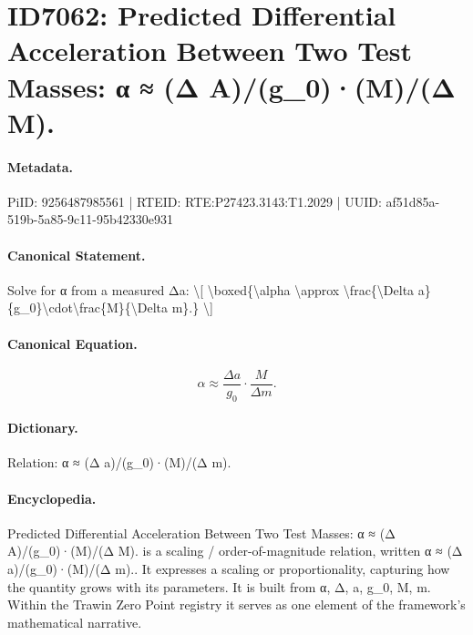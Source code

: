 \section*{ID7062: Predicted Differential Acceleration Between Two Test Masses: α ≈ (Δ A)/(g\_0)·(M)/(Δ M).}
\paragraph{Metadata.}
PiID: 9256487985561 | RTEID: RTE:P27423.3143:T1.2029 | UUID: af51d85a-519b-5a85-9c11-95b42330e931

\paragraph{Canonical Statement.}
Solve for α from a measured Δa: \textbackslash{}[ \textbackslash{}boxed\{\textbackslash{}alpha \textbackslash{}approx \textbackslash{}frac\{\textbackslash{}Delta a\}\{g\_0\}\textbackslash{}cdot\textbackslash{}frac\{M\}\{\textbackslash{}Delta m\}.\} \textbackslash{}]

\paragraph{Canonical Equation.}
\[
\boxed{\alpha \approx \frac{\Delta a}{g_0}\cdot\frac{M}{\Delta m}.}
\]

\paragraph{Dictionary.}
Relation: α ≈ (Δ a)/(g\_0)·(M)/(Δ m).

\paragraph{Encyclopedia.}
Predicted Differential Acceleration Between Two Test Masses: α ≈ (Δ A)/(g\_0)·(M)/(Δ M). is a scaling / order-of-magnitude relation, written α ≈ (Δ a)/(g\_0)·(M)/(Δ m).. It expresses a scaling or proportionality, capturing how the quantity grows with its parameters. It is built from α, Δ, a, g\_0, M, m. Within the Trawin Zero Point registry it serves as one element of the framework's mathematical narrative.

